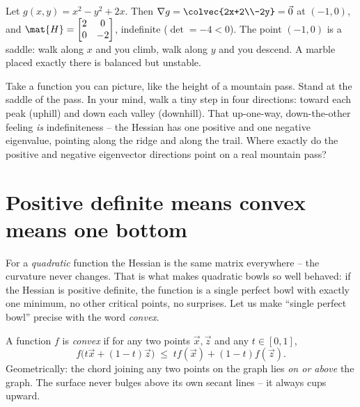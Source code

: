 \begin{example}[A saddle]
\label{ch36:ex-saddle}
Let $g(x,y)=x^2 - y^2 + 2x$. Then $\nabla g=\colvec{2x+2\\-2y}=\vec0$ at $(-1,0)$,
and $\mat{H}=\begin{bmatrix}2&0\\0&-2\end{bmatrix}$, indefinite ($\det=-4<0$). The
point $(-1,0)$ is a saddle: walk along $x$ and you climb, walk along $y$ and you
descend. A marble placed exactly there is balanced but unstable.
\end{example}

\begin{walkbox}
Take a function you can picture, like the height of a mountain pass. Stand at the
saddle of the pass. In your mind, walk a tiny step in four directions: toward each
peak (uphill) and down each valley (downhill). That up-one-way, down-the-other
feeling \emph{is} indefiniteness -- the Hessian has one positive and one negative
eigenvalue, pointing along the ridge and along the trail. Where exactly do the
positive and negative eigenvector directions point on a real mountain pass?
\end{walkbox}

\section{Positive definite means convex means one bottom}
\label{ch36:convexity}

For a \emph{quadratic} function the Hessian is the same matrix everywhere -- the
curvature never changes. That is what makes quadratic bowls so well behaved: if the
Hessian is positive definite, the function is a single perfect bowl with exactly one
minimum, no other critical points, no surprises. Let us make ``single perfect bowl''
precise with the word \emph{convex}.

\begin{definition}
\label{ch36:def-convex}
A function $f$ is \emph{convex} if for any two points $\vec{x},\vec{z}$ and any
$t\in[0,1]$,
\[
  f\big(t\vec{x} + (1-t)\vec{z}\big) \;\le\; t f(\vec{x}) + (1-t) f(\vec{z}).
\]
Geometrically: the chord joining any two points on the graph lies \emph{on or above}
the graph. The surface never bulges above its own secant lines -- it always cups
upward.
\end{definition}

